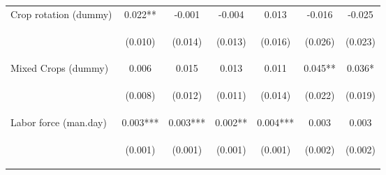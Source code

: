 \begin{center}
\begin{tabular}{lcccccc}
Crop rotation (dummy) & 0.022** & -0.001 & -0.004 & 0.013 & -0.016 & -0.025 \\
\vspace{4pt} & \begin{footnotesize}(0.010)\end{footnotesize} & \begin{footnotesize}(0.014)\end{footnotesize} & \begin{footnotesize}(0.013)\end{footnotesize} & \begin{footnotesize}(0.016)\end{footnotesize} & \begin{footnotesize}(0.026)\end{footnotesize} & \begin{footnotesize}(0.023)\end{footnotesize} \\
Mixed Crops (dummy) & 0.006 & 0.015 & 0.013 & 0.011 & 0.045** & 0.036* \\
\vspace{4pt} & \begin{footnotesize}(0.008)\end{footnotesize} & \begin{footnotesize}(0.012)\end{footnotesize} & \begin{footnotesize}(0.011)\end{footnotesize} & \begin{footnotesize}(0.014)\end{footnotesize} & \begin{footnotesize}(0.022)\end{footnotesize} & \begin{footnotesize}(0.019)\end{footnotesize} \\
Labor force (man.day) & 0.003*** & 0.003*** & 0.002** & 0.004*** & 0.003 & 0.003 \\
\vspace{4pt} & \begin{footnotesize}(0.001)\end{footnotesize} & \begin{footnotesize}(0.001)\end{footnotesize} & \begin{footnotesize}(0.001)\end{footnotesize} & \begin{footnotesize}(0.001)\end{footnotesize} & \begin{footnotesize}(0.002)\end{footnotesize} & \begin{footnotesize}(0.002)\end{footnotesize} \\

\end{tabular}
\end{center}
